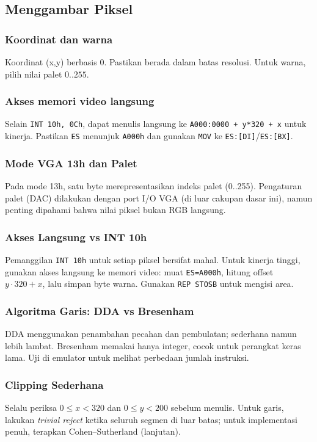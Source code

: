 \documentclass[../main.tex]{subfiles}
\begin{document}
\subsection{Menggambar Piksel}
\subsubsection{Koordinat dan warna}
Koordinat (x,y) berbasis 0. Pastikan berada dalam batas resolusi. Untuk warna, pilih nilai palet \(0..255\).

\subsubsection{Akses memori video langsung}
Selain \texttt{INT 10h, 0Ch}, dapat menulis langsung ke \texttt{A000:0000 + y*320 + x} untuk kinerja. Pastikan \texttt{ES} menunjuk \texttt{A000h} dan gunakan \texttt{MOV} ke \texttt{ES:[DI]}/\texttt{ES:[BX]}.

\subsubsection{Mode VGA 13h dan Palet}
Pada mode 13h, satu byte merepresentasikan indeks palet (0..255). Pengaturan palet (DAC) dilakukan dengan port I/O VGA (di luar cakupan dasar ini), namun penting dipahami bahwa nilai piksel bukan RGB langsung.

\subsubsection{Akses Langsung vs INT 10h}
Pemanggilan \texttt{INT 10h} untuk setiap piksel bersifat mahal. Untuk kinerja tinggi, gunakan akses langsung ke memori video: muat \texttt{ES=A000h}, hitung offset \(y\cdot 320 + x\), lalu simpan byte warna. Gunakan \texttt{REP STOSB} untuk mengisi area.

\subsubsection{Algoritma Garis: DDA vs Bresenham}
DDA menggunakan penambahan pecahan dan pembulatan; sederhana namun lebih lambat. Bresenham memakai hanya integer, cocok untuk perangkat keras lama. Uji di emulator untuk melihat perbedaan jumlah instruksi.

\subsubsection{Clipping Sederhana}
Selalu periksa \(0 \le x < 320\) dan \(0 \le y < 200\) sebelum menulis. Untuk garis, lakukan \textit{trivial reject} ketika seluruh segmen di luar batas; untuk implementasi penuh, terapkan Cohen–Sutherland (lanjutan).
\end{document}

